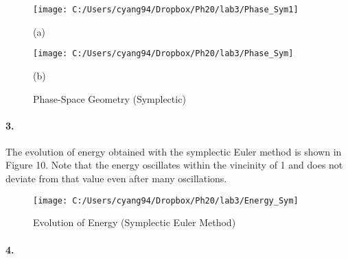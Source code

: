\documentclass[english]{article}
\begin{document}
\begin{figure}[H]
\caption{Phase-Space Geometry (Symplectic)}


\noindent %
\begin{minipage}[t]{0.5\columnwidth}%
\noindent \begin{center}
\texttt{[image: C:/Users/cyang94/Dropbox/Ph20/lab3/Phase\_Sym1]}
\par\end{center}

\noindent \begin{center}
(a)
\par\end{center}%
\end{minipage}%
\begin{minipage}[t]{0.5\columnwidth}%
\noindent \begin{center}
\texttt{[image: C:/Users/cyang94/Dropbox/Ph20/lab3/Phase\_Sym]}
\par\end{center}

\noindent \begin{center}
(b)
\par\end{center}%
\end{minipage}
\end{figure}



\paragraph*{3.}

The evolution of energy obtained with the symplectic Euler method
is shown in Figure 10. Note that the energy oscillates within the
vincinity of 1 and does not deviate from that value even after many
oscillations.

\begin{figure}[H]


\caption{Evolution of Energy (Symplectic Euler Method)}


\noindent \begin{centering}
\texttt{[image: C:/Users/cyang94/Dropbox/Ph20/lab3/Energy\_Sym]}
\par\end{centering}

\end{figure}



\paragraph*{4.}
\end{document}
